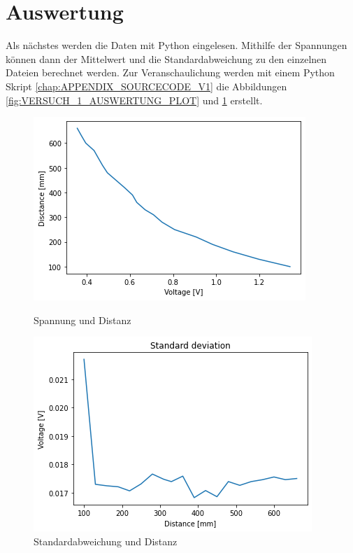 \documentclass[12pt, oneside, a4paper, \docLanguage]{report}
\begin{document}
\section{Auswertung}
\label{chap:VERSUCH_1_AUSWERTUNG}
Als nächstes werden die Daten mit Python eingelesen. Mithilfe der Spannungen können dann der Mittelwert und die Standardabweichung zu den einzelnen Dateien berechnet werden. 
Zur Veranschaulichung werden mit einem Python Skript \ref{chap:APPENDIX_SOURCECODE_V1} die Abbildungen \ref{fig:VERSUCH_1_AUSWERTUNG_PLOT} und \ref{fig:VERSUCH_1_AUSWERTUNG_PLOT2} erstellt.
\begin{figure}[H]
	\centering\small
	\includegraphics[width=\textwidth]{media/plot_versuch1_spannung_abstand}
	\caption{Spannung und Distanz}
	\label{fig:VERSUCH_1_AUSWERTUNG_PLOT}

	\centering\small
	\includegraphics[width=\textwidth]{media/plot_versuch1_abstand_abweichung.png}
	\caption{Standardabweichung und Distanz}
	\label{fig:VERSUCH_1_AUSWERTUNG_PLOT2}
\end{figure}
\end{document}
